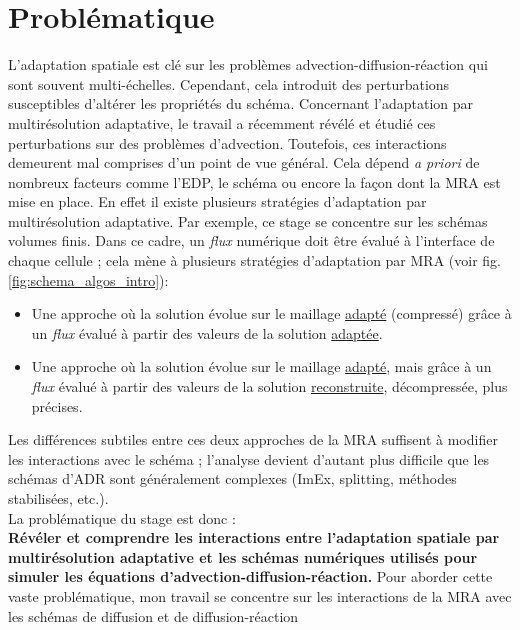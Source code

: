     \section{Problématique}
    \label{par:problematique}
        L'adaptation spatiale est clé sur les problèmes advection-diffusion-réaction qui sont souvent multi-échelles.
        Cependant, cela introduit des perturbations susceptibles d'altérer les propriétés du schéma.
        Concernant l'adaptation par multirésolution adaptative, le travail \cite{belloti_et_al_2025} a récemment révélé et étudié 
        ces perturbations sur des problèmes d'advection. 
        Toutefois, ces interactions demeurent mal comprises d'un point de vue général.
        Cela dépend \emph{a priori} de nombreux facteurs comme l'EDP, le schéma ou encore la façon dont la MRA est mise en place. 
        En effet il existe plusieurs stratégies d'adaptation par multirésolution adaptative. Par exemple, ce stage se concentre sur les schémas volumes finis.
        Dans ce cadre, un \emph{flux} numérique doit être évalué à l'interface de chaque cellule ; cela mène à plusieurs stratégies d'adaptation par MRA (voir fig. \ref{fig:schema_algos_intro}): 
        \begin{itemize}
            \item Une approche  où la solution évolue sur le maillage \underline{adapté} (compressé) grâce à un \emph{flux} évalué à partir des valeurs de la solution \underline{adaptée}.
            \item Une approche  où la solution évolue sur le maillage \underline{adapté}, mais grâce à un \emph{flux} évalué à partir des valeurs de la solution \underline{reconstruite}, décompressée, plus précises.
        \end{itemize}
        Les différences subtiles entre ces deux approches de la MRA suffisent à modifier les interactions avec le schéma ;
        l'analyse devient d'autant plus difficile que les schémas d'ADR sont généralement complexes (ImEx, splitting, méthodes stabilisées, etc.).\\
    La problématique du stage est donc : \\\textbf{Révéler et comprendre les interactions entre l'adaptation spatiale par multirésolution adaptative et les schémas numériques 
    utilisés pour simuler les équations d'advection-diffusion-réaction.}
    Pour aborder cette vaste problématique, mon travail se concentre sur les interactions de la MRA avec les schémas de diffusion et de diffusion-réaction
